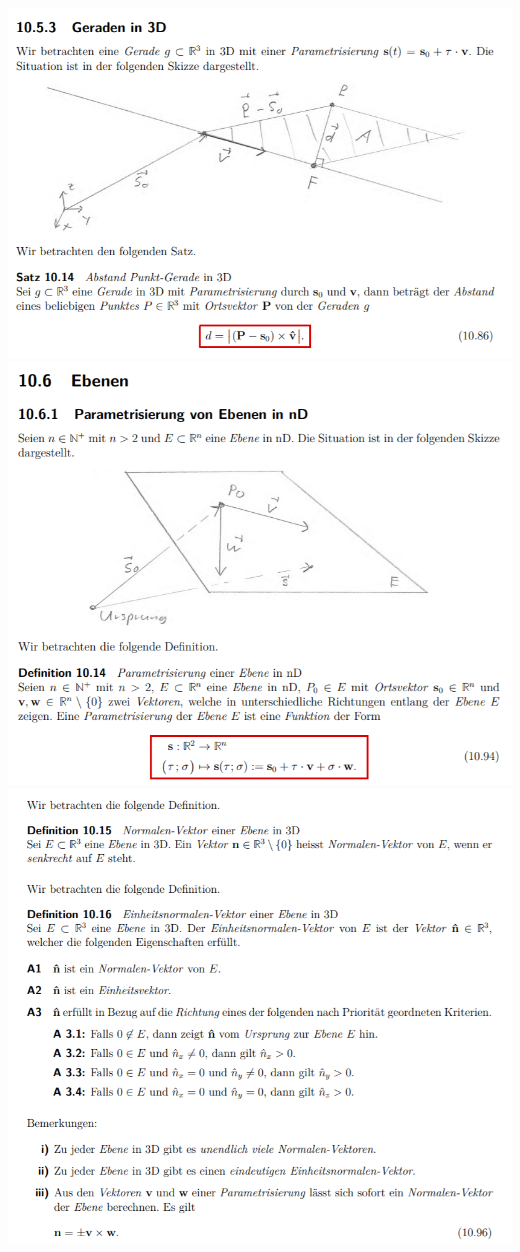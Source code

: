 \includegraphics[width=\columnwidth]{./images/vek29.png}
\includegraphics[width=\columnwidth]{./images/vek30.png}
\includegraphics[width=\columnwidth]{./images/vek31.png}
